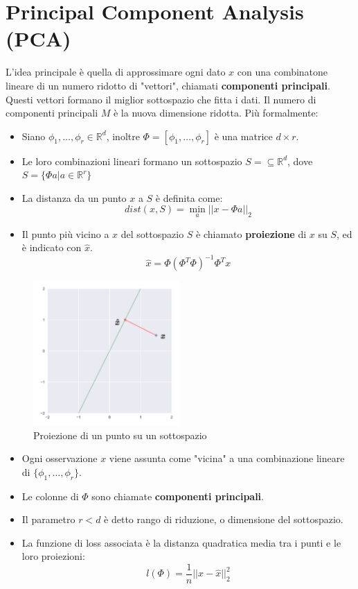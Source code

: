 \documentclass{../main.tex}[subfiles]
\begin{document}
\section{Principal Component Analysis (PCA)}
L'idea principale è quella di approssimare ogni dato $x$ con una combinatone lineare di un numero ridotto di "vettori", chiamati \textbf{componenti principali}.
Questi vettori formano il miglior sottospazio che fitta i dati. Il numero di componenti principali $M$ è la nuova dimensione ridotta.
Più formalmente:
\begin{itemize}
	\item Siano $\phi_1, \ldots, \phi_r\in\mathbb{R}^d$, inoltre $\Phi=[\phi_1, \ldots, \phi_r]$ è una matrice $d\times r$. 
	\item Le loro combinazioni lineari formano un sottospazio $S=\subseteq \mathbb{R}^d$, dove $S=\{\Phi a | a\in\mathbb{R}^r\}$
	\item La distanza da un punto $x$ a $S$ è definita come: \[dist(x, S)= \min_{a} ||x-\Phi a ||_2\]
	\item Il punto più vicino a $x$ del sottospazio $S$ è chiamato \textbf{proiezione} di $x$ su $S$, ed è indicato con $\hat{x}$.
	\[\hat{x}=\Phi (\Phi^T\Phi)^{-1}\Phi^T x\]
\end{itemize}
\begin{figure}[H]
	\centering
	\includegraphics[width=0.5\textwidth]{pictures/proiezione.png}
	\caption{Proiezione di un punto su un sottospazio}
\end{figure}
\begin{itemize}
	\item Ogni osservazione $x$ viene assunta come "vicina" a una combinazione lineare di $\{\phi_1, \ldots, \phi_r\}$.
	\item Le colonne di $\Phi$ sono chiamate \textbf{componenti principali}.
	\item Il parametro $r<d$ è detto rango di riduzione, o dimensione del sottospazio.
	\item La funzione di loss associata è la distanza quadratica media tra i punti e le loro proiezioni:
	\[l(\Phi)=\frac{1}{n}||x-\hat{x}||_2^2\]
\end{itemize}
\end{document}
